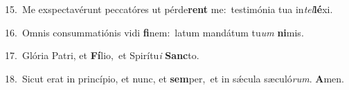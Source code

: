 {\numbfont\textcolor{\numbcolor}{15.}}~Me exspectavérunt peccatóres ut pérde\textbf{rent} me:~\star testimónia tua in\-\textit{tel}\-\textbf{lé}xi.\par
{\numbfont\textcolor{\numbcolor}{16.}}~Omnis consummatiónis vidi \textbf{fi}\-nem:~\star latum mandátum tu\textit{um} \textbf{ni}\-mis.\par
{\numbfont\textcolor{\numbcolor}{17.}}~Glória Patri, et \textbf{Fí}\-lio,~\star et Spirítu\textit{i} \textbf{Sanc}\-to.\par
{\numbfont\textcolor{\numbcolor}{18.}}~Sicut erat in princípio, et nunc, et \textbf{sem}\-per,~\star et in sǽcula sæculó\-\textit{rum}\-. \textbf{A}\-men.\par
